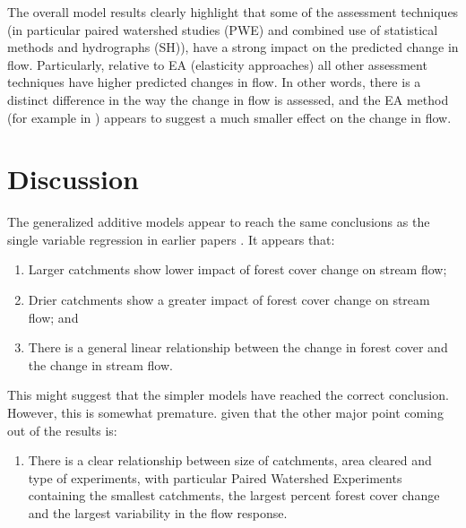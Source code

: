 \documentclass[]{elsarticle} %
\providecommand{\tightlist}{%
  \setlength{\itemsep}{0pt}\setlength{\parskip}{0pt}}
\begin{document}
The overall model results clearly highlight that some of the assessment techniques (in particular paired watershed studies (PWE) and combined use of statistical methods and hydrographs (SH)), have a strong impact on the predicted change in flow. Particularly, relative to EA (elasticity approaches) all other assessment techniques have higher predicted changes in flow. In other words, there is a distinct difference in the way the change in flow is assessed, and the EA method (for example in \citet{zhou2015}) appears to suggest a much smaller effect on the change in flow.

\hypertarget{discussion}{%
\section{Discussion}\label{discussion}}

The generalized additive models appear to reach the same conclusions as the single variable regression in earlier papers \citep{zhang2017, filoso2017}. It appears that:

\begin{enumerate}
\def\labelenumi{\arabic{enumi}.}
\tightlist
\item
  Larger catchments show lower impact of forest cover change on stream flow;
\item
  Drier catchments show a greater impact of forest cover change on stream flow; and
\item
  There is a general linear relationship between the change in forest cover and the change in stream flow.
\end{enumerate}

This might suggest that the simpler models have reached the correct conclusion. However, this is somewhat premature. given that the other major point coming out of the results is:

\begin{enumerate}
\def\labelenumi{\arabic{enumi}.}
\setcounter{enumi}{3}
\tightlist
\item
  There is a clear relationship between size of catchments, area cleared and type of experiments, with particular Paired Watershed Experiments containing the smallest catchments, the largest percent forest cover change and the largest variability in the flow response.
\end{enumerate}
\end{document}
